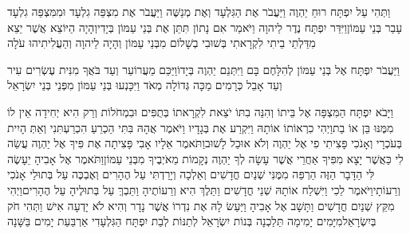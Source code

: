 \documentclass[../main/main.tex]{subfiles}
\begin{document}
\begin{multicols*}{\ncols}
וַתְּהִי עַל יִפְתָּח רוּחַ יַהְוֶה וַיַּעֲבֹר אֶת הַגִּלְעָד וְאֶת מְנַשֶּׁה וַיַּעֲבֹר אֶת מִצְפֵּה גִלְעָד וּמִמִּצְפֵּה גִלְעָד עָבַר בְּנֵי עַמּוֹן\PreVerseSpace{}וַיִּדַּר יִפְתָּח נֶדֶר לַיהוָה וַיֹּאמַר אִם נָתוֹן תִּתֵּן אֶת בְּנֵי עַמּוֹן בְּיָדִי\PreVerseSpace{}וְהָיָה הַיּוֹצֵא אֲשֶׁר יֵצֵא מִדַּלְתֵי בֵיתִי לִקְרָאתִי בְּשׁוּבִי בְשָׁלוֹם מִבְּנֵי עַמּוֹן וְהָיָה לַיהוָה וְהַעֲלִיתִיהוּ עֹלָה\OpenSection{}\par
{}וַיַּעֲבֹר יִפְתָּח אֶל בְּנֵי עַמּוֹן לְהִלָּחֶם בָּם וַיִּתְּנֵם יַהְוֶה בְּיָדוֹ\PreVerseSpace{}וַיַּכֵּם מֵעֲרוֹעֵר וְעַד בֹּאֲךָ מִנִּית עֶשְׂרִים עִיר וְעַד אָבֵל כְּרָמִים מַכָּה גְּדוֹלָה מְאֹד וַיִּכָּנְעוּ בְּנֵי עַמּוֹן מִפְּנֵי בְּנֵי יִשְׂרָאֵל\OpenSection{}\par
{}וַיָּבֹא יִפְתָּח הַמִּצְפָּה אֶל בֵּיתוֹ וְהִנֵּה בִתּוֹ יֹצֵאת לִקְרָאתוֹ בְּתֻפִּים וּבִמְחֹלוֹת וְרַק הִיא יְחִידָה אֵין לוֹ מִמֶּנּוּ בֵּן אוֹ בַת\PreVerseSpace{}וַיְהִי כִרְאוֹתוֹ אוֹתָהּ וַיִּקְרַע אֶת בְּגָדָיו וַיֹּאמֶר אֲהָהּ בִּתִּי הַכְרֵעַ הִכְרַעְתִּנִי וְאַתְּ הָיִית בְּעֹכְרָי וְאָנֹכִי פָּצִיתִי פִי אֶל יַהְוֶה וְלֹא אוּכַל לָשׁוּב\PreVerseSpace{}וַתֹּאמֶר אֵלָיו אָבִי פָּצִיתָה אֶת פִּיךָ אֶל יַהְוֶה עֲשֵׂה לִי כַּאֲשֶׁר יָצָא מִפִּיךָ אַחֲרֵי אֲשֶׁר עָשָׂה לְךָ יַהְוֶה נְקָמוֹת מֵאֹיְבֶיךָ מִבְּנֵי עַמּוֹן\PreVerseSpace{}וַתֹּאמֶר אֶל אָבִיהָ יֵעָשֶׂה לִּי הַדָּבָר הַזֶּה הַרְפֵּה מִמֶּנִּי שְׁנַיִם חֳדָשִׁים וְאֵלְכָה וְיָרַדְתִּי עַל הֶהָרִים וְאֶבְכֶּה עַל בְּתוּלַי אָנֹכִי וְרֵעוֹתָי\SubEnd{}\PreVerseSpace{}וַיֹּאמֶר לֵכִי וַיִּשְׁלַח אוֹתָהּ שְׁנֵי חֳדָשִׁים וַתֵּלֶךְ הִיא וְרֵעוֹתֶיהָ וַתֵּבְךְּ עַל בְּתוּלֶיהָ עַל הֶהָרִים\PreVerseSpace{}וַיְהִי מִקֵּץ שְׁנַיִם חֳדָשִׁים וַתָּשָׁב אֶל אָבִיהָ וַיַּעַשׂ לָהּ אֶת נִדְרוֹ אֲשֶׁר נָדָר וְהִיא לֹא יָדְעָה אִישׁ וַתְּהִי חֹק בְּיִשְׂרָאֵל\PreVerseSpace{}מִיָּמִים יָמִימָה תֵּלַכְנָה בְּנוֹת יִשְׂרָאֵל לְתַנּוֹת לְבַת יִפְתָּח הַגִּלְעָדִי אַרְבַּעַת יָמִים בַּשָּׁנָה\OpenSection{}\par

\end{multicols*}
\end{document}
